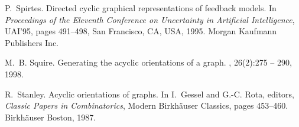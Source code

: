 \documentclass{llncs}
\begin{document}
\begin{thebibliography}{10}
P.~Spirtes.
\newblock Directed cyclic graphical representations of feedback models.
\newblock In {\em Proceedings of the Eleventh Conference on Uncertainty in
  Artificial Intelligence}, UAI'95, pages 491--498, San Francisco, CA, USA,
  1995. Morgan Kaufmann Publishers Inc.

M.~B. Squire.
\newblock Generating the acyclic orientations of a graph.
, 26(2):275 -- 290, 1998.

R.~Stanley.
\newblock Acyclic orientations of graphs.
\newblock In I.~Gessel and G.-C. Rota, editors, {\em Classic Papers in
  Combinatorics}, Modern Birkh\"auser Classics, pages 453--460. Birkh\"auser
  Boston, 1987.

\end{thebibliography}
\end{document}
